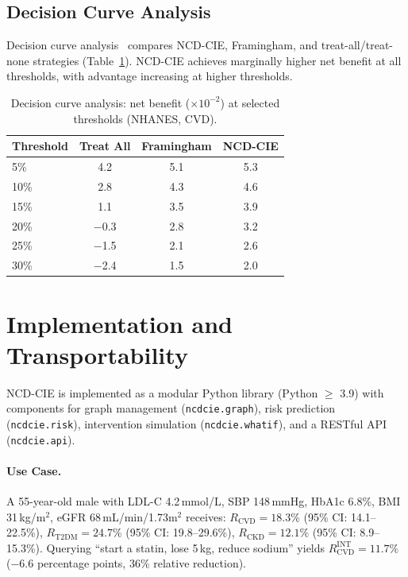 \documentclass[runningheads]{llncs}
\begin{document}
\subsection{Decision Curve Analysis}\label{sec:dca}

Decision curve analysis~\cite{vickers2006dca} compares NCD-CIE,
Framingham, and treat-all/treat-none strategies
(Table~\ref{tab:dca}).  NCD-CIE achieves marginally higher net benefit
at all thresholds, with advantage increasing at higher thresholds.

\begin{table}[t]
\centering
\caption{Decision curve analysis: net benefit ($\times 10^{-2}$) at
selected thresholds (NHANES, CVD).}
\label{tab:dca}
\small
\begin{tabular}{@{}lccc@{}}
\toprule
\textbf{Threshold} & \textbf{Treat All} & \textbf{Framingham} &
\textbf{NCD-CIE} \\
\midrule
5\%  & 4.2 & 5.1 & 5.3 \\
10\% & 2.8 & 4.3 & 4.6 \\
15\% & 1.1 & 3.5 & 3.9 \\
20\% & $-$0.3 & 2.8 & 3.2 \\
25\% & $-$1.5 & 2.1 & 2.6 \\
30\% & $-$2.4 & 1.5 & 2.0 \\
\bottomrule
\end{tabular}
\end{table}

\section{Implementation and Transportability}\label{sec:impl}

NCD-CIE is implemented as a modular Python library (Python $\geq$
3.9) with components for graph management (\texttt{ncdcie.graph}),
risk prediction (\texttt{ncdcie.risk}), intervention simulation
(\texttt{ncdcie.whatif}), and a RESTful API (\texttt{ncdcie.api}).

\paragraph{Use Case.}
A 55-year-old male with LDL-C 4.2\,mmol/L, SBP 148\,mmHg, HbA1c
6.8\%, BMI 31\,kg/m$^2$, eGFR 68\,mL/min/1.73m$^2$ receives:
$R_{\text{CVD}} = 18.3\%$ (95\% CI: 14.1--22.5\%),
$R_{\text{T2DM}} = 24.7\%$ (95\% CI: 19.8--29.6\%),
$R_{\text{CKD}} = 12.1\%$ (95\% CI: 8.9--15.3\%).
Querying ``start a statin, lose 5\,kg, reduce sodium'' yields
$R_{\text{CVD}}^{\text{INT}} = 11.7\%$ ($-$6.6 percentage points,
36\% relative reduction).
\end{document}
